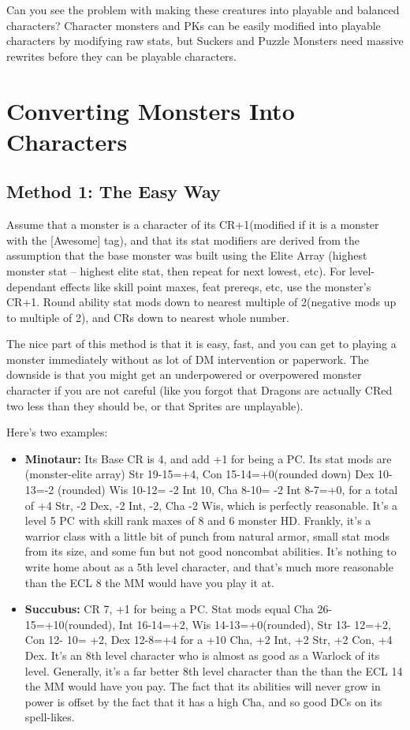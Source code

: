Can you see the problem with making these creatures into playable and balanced characters? Character monsters and PKs can be easily modified into playable characters by modifying raw stats, but Suckers and Puzzle Monsters need massive rewrites before they can be playable characters.

\section{Converting Monsters Into Characters}

\subsection{Method 1: The Easy Way}
Assume that a monster is a character of its CR+1(modified if it is a monster with the [Awesome] tag), and that its stat modifiers are derived from the assumption that the base monster was built using the Elite Array (highest monster stat -- highest elite stat, then repeat for next lowest, etc). For level-dependant effects like skill point maxes, feat prereqs, etc, use the monster's CR+1. Round ability stat mods down to nearest multiple of 2(negative mods up to multiple of 2), and CRs down to nearest whole number.

The nice part of this method is that it is easy, fast, and you can get to playing a monster immediately without as lot of DM intervention or paperwork. The downside is that you might get an underpowered or overpowered monster character if you are not careful (like you forgot that Dragons are actually CRed two less than they should be, or that Sprites are unplayable).

Here's two examples:

\begin{itemize}\itemspace
   \item \textbf{Minotaur:} Its Base CR is 4, and add +1 for being a PC. Its stat mods are (monster-elite array) Str 19-15=+4, Con 15-14=+0(rounded down) Dex 10-13=-2 (rounded) Wis 10-12= -2 Int 10, Cha 8-10= -2 Int 8-7=+0, for a total of +4 Str, -2 Dex, -2 Int, -2, Cha -2 Wis, which is perfectly reasonable. It's a level 5 PC with skill rank maxes of 8 and 6 monster HD.
      Frankly, it's a warrior class with a little bit of punch from natural armor, small stat mods from its size, and some fun but not good noncombat abilities. It's nothing to write home about as a 5th level character, and that's much more reasonable than the ECL 8 the MM would have you play it at.
   \item \textbf{Succubus:} CR 7, +1 for being a PC. Stat mods equal Cha 26-15=+10(rounded), Int 16-14=+2, Wis 14-13=+0(rounded), Str 13- 12=+2, Con 12- 10= +2, Dex 12-8=+4 for a +10 Cha, +2 Int, +2 Str, +2 Con, +4 Dex.
      It's an 8th level character who is almost as good as a Warlock of its level. Generally, it's a far better 8th level character than the than the ECL 14 the MM would have you pay. The fact that its abilities will never grow in power is offset by the fact that it has a high Cha, and so good DCs on its spell-likes.
\end{itemize}

